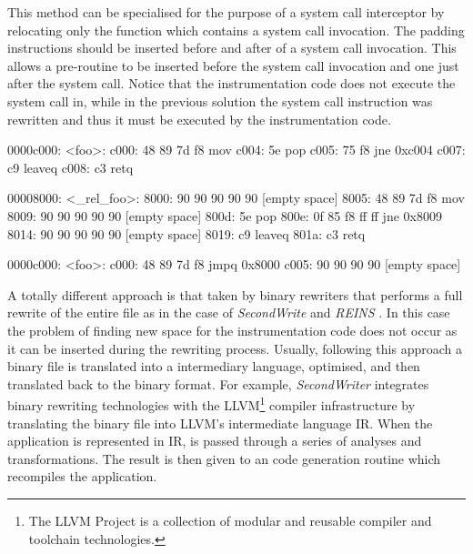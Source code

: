 This method can be specialised for the purpose of a system call interceptor by relocating only the function which contains a system call invocation. The padding instructions should be inserted before and after of a system call invocation. This allows a pre-routine to be inserted before the system call invocation and one just after the system call. Notice that the instrumentation code does not execute the system call in, while in the previous solution the system call instruction was rewritten and thus it must be executed by the instrumentation code. 

\begin{asm_top}[caption={Original instructions, x64 architecture}, label={foo}]
   	0000c000: <foo>: 
   	c000: 48 89 7d f8				mov %
   	c004: 5e         				pop %
   	c005: 75 f8	     				jne 0xc004
   	c007: c9         				leaveq	
   	c008: c3         				retq
   	
\end{asm_top}


\begin{asm_top}[label=relocated_foo, caption={Instructions after the rewriting process using a relocation code approach at functional level}]
00008000: <_rel_foo>: 
    8000: 90 90 90 90 90		[empty space]
   	8005: 48 89 7d f8   		mov %
   	8009: 90 90 90 90 90 		[empty space]
   	800d: 5e            		pop %
   	800e: 0f 85 f8 ff ff		jne 0x8009
   	8014: 90 90 90 90 90 		[empty space]
   	8019: c9            		leaveq	
   	801a: c3            		retq

0000c000: <foo>: 
   	c000: 48 89 7d f8   		jmpq 0x8000
   	c005: 90 90 90 90 			[empty space]

\end{asm_top}


A totally different approach is that taken by binary rewriters that performs a full rewrite of the entire file as in the case of \emph{SecondWrite} \cite{SEC1, SEC2} and \emph{REINS} \cite{REINS}.  In this case the problem of finding new space for the instrumentation code does not occur as it can be inserted during the rewriting process. Usually, following this approach a binary file is translated into a intermediary language, optimised, and then translated back to the binary format. For example, \emph{SecondWriter} integrates binary rewriting technologies with the  LLVM\footnote{The LLVM Project is a collection of modular and reusable compiler and toolchain technologies.} \cite{LLVM} compiler infrastructure by translating the binary file into LLVM's intermediate language IR. When the application is represented in IR, is passed through a series of analyses and transformations. The result is then given to an code generation routine which recompiles the application.   


